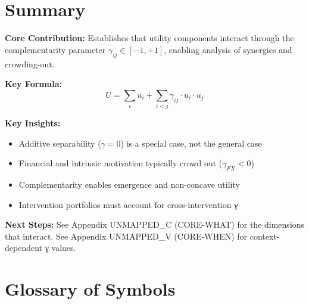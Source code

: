 \section{Summary}
\label{sec:how-summary}

\begin{tcolorbox}[colback=gray!5!white, colframe=gray!75!black,
    title=Appendix UNMAPPED_B Summary: CORE-HOW]

\textbf{Core Contribution:}
Establishes that utility components interact through the complementarity parameter
$\gamma_{ij} \in [-1, +1]$, enabling analysis of synergies and crowding-out.

\textbf{Key Formula:}
\begin{equation}
U = \sum_i u_i + \sum_{i < j} \gamma_{ij} \cdot u_i \cdot u_j
\end{equation}

\textbf{Key Insights:}
\begin{itemize}[nosep]
\item Additive separability ($\gamma = 0$) is a special case, not the general case
\item Financial and intrinsic motivation typically crowd out ($\gamma_{FX} < 0$)
\item Complementarity enables emergence and non-concave utility
\item Intervention portfolios must account for cross-intervention γ
\end{itemize}

\textbf{Next Steps:}
See Appendix UNMAPPED_C (CORE-WHAT) for the dimensions that interact.
See Appendix UNMAPPED_V (CORE-WHEN) for context-dependent γ values.

\end{tcolorbox}


\section{Glossary of Symbols}
\label{sec:how-glossary}

